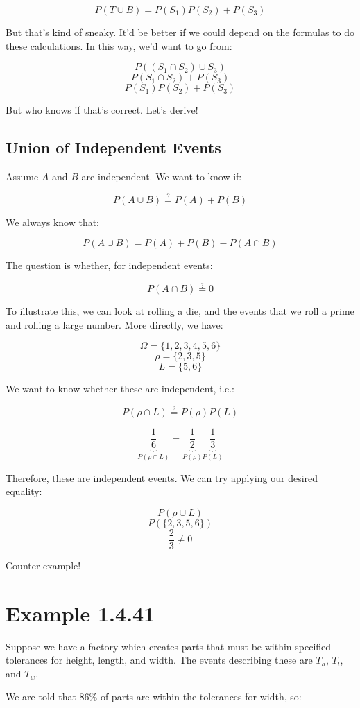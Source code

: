 \documentclass{article}
\begin{document}
\[
P(T\cup B)=P(S_1)P(S_2)+P(S_3)
\]

But that's kind of sneaky. It'd be better if we could depend on the
formulas to do these calculations. In this way, we'd want to go from:

\[
P((S_1\cap S_2)\cup S_3)
\] \[
P(S_1\cap S_2)+P(S_3)
\] \[
P(S_1)P(S_2)+P(S_3)
\]

But who knows if that's correct. Let's derive!

\subsection*{Union of Independent Events}

Assume $A$ and $B$ are independent. We want to know if:

\[
P(A\cup B)\overset{?}{=}P(A)+P(B)
\]

We always know that:

\[
P(A\cup B)=P(A)+P(B)-P(A\cap B)
\]

The question is whether, for independent events:

\[
P(A\cap B)\overset{?}{=} 0
\]

To illustrate this, we can look at rolling a die, and the events that
we roll a prime and rolling a large number. More directly, we have:

\[
\Omega=\{1,2,3,4,5,6\}
\] \[
\rho=\{2,3,5\}
\] \[
L=\{5,6\}
\]

We want to know whether these are independent, i.e.:

\[
P(\rho\cap L)\overset{?}{=}P(\rho)P(L)
\]

\[
\underbrace{\frac{1}{6}}_{P(\rho\cap L)}=\underbrace{\frac{1}{2}}_{P(\rho)}\underbrace{\frac{1}{3}}_{P(L)}
\]

Therefore, these are independent events. We can try applying our
desired equality:

\[
P(\rho\cup L)
\] \[
P(\{2,3,5,6\})
\] \[
\frac{2}{3} \ne 0
\]

Counter-example!

\section*{Example 1.4.41}

Suppose we have a factory which creates parts that must be within
specified tolerances for height, length, and width. The events
describing these are $T_h$, $T_l$, and $T_w$.

We are told that 86\% of parts are within the tolerances for width, so:
\end{document}

